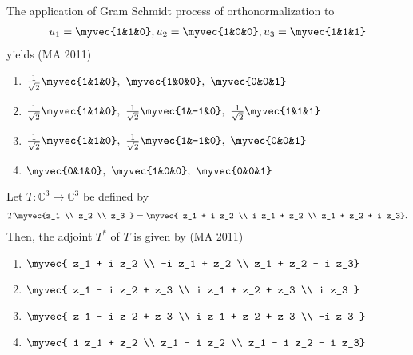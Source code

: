 %
\item The application of Gram Schmidt process of orthonormalization to 
\begin{align*}
u_1 = \myvec{1&1&0}, u_2 = \myvec{1&0&0}, u_3 = \myvec{1&1&1}
\end{align*}
yields
\hfill{(MA 2011)}
\begin{enumerate}
    \item $\frac{1}{\sqrt{2}}\myvec{1&1&0},\ \myvec{1&0&0},\ \myvec{0&0&1}$
    \item $\frac{1}{\sqrt{2}}\myvec{1&1&0},\ \frac{1}{\sqrt{2}}\myvec{1&-1&0},\ \frac{1}{\sqrt{2}}\myvec{1&1&1}$
    \item  $\frac{1}{\sqrt{2}}\myvec{1&1&0},\ \frac{1}{\sqrt{2}}\myvec{1&-1&0},\ \myvec{0&0&1}$
    \item  $\myvec{0&1&0},\ \myvec{1&0&0},\ \myvec{0&0&1}$
\end{enumerate}
%
\item Let $T:\mathbb{C}^3 \to \mathbb{C}^3$ be defined by 
\begin{align*}
T \myvec{z_1 \\ z_2 \\ z_3 } =
\myvec{
z_1 + i z_2 \\
i z_1 + z_2 \\
z_1 + z_2 + i z_3}
.\end{align*}
Then, the adjoint $T^*$ of $T$ is given by 
\hfill{(MA 2011)}
\begin{multicols}{4}
\begin{enumerate}
\item  $\myvec{ z_1 + i z_2 \\ -i z_1 + z_2 \\ z_1 + z_2 - i z_3}$
\item  $\myvec{ z_1 - i z_2 + z_3 \\ i z_1 + z_2 + z_3 \\ i z_3 }$
\item  $\myvec{ z_1 - i z_2 + z_3 \\ i z_1 + z_2 + z_3 \\ -i z_3 }$
\item  $\myvec{ i z_1 + z_2 \\ z_1 - i z_2 \\ z_1 - i z_2 - i z_3}$
\end{enumerate}
\end{multicols}
